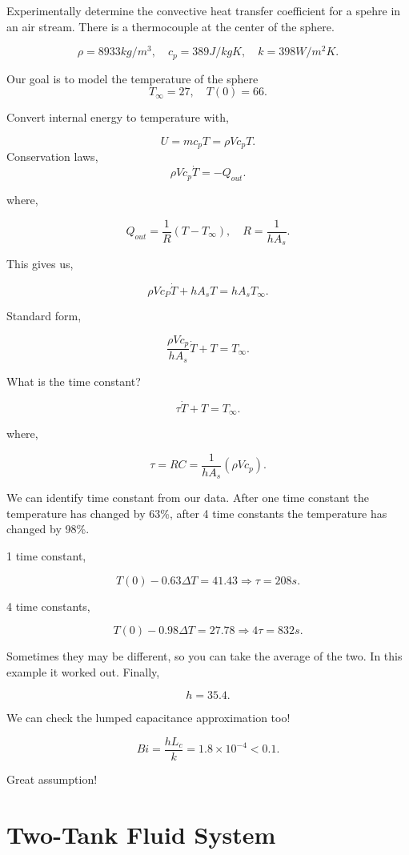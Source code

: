 \documentclass[12pt, a4paper]{report}
\begin{document}
  Experimentally determine the convective heat transfer coefficient for a spehre in an air stream. There is a thermocouple at the center of the sphere.

  \[
      \rho = 8933 kg/m^3, \quad c_p = 389 J/kgK, \quad k = 398 W/m^2K
    .\]

  Our goal is to model the temperature of the sphere
  \[
      T_{\infty} = 27, \quad T(0) = 66
    .\]

  Convert internal energy to temperature with,

  \[
      U = mc_pT = \rho Vc_pT
    .\]
  Conservation laws,
  \[
      \rho Vc_p \dot T = -Q_{out}
    .\]

  where,

  \[
      Q_{out} = \frac{1}{R}(T - T_{\infty}), \quad R = \frac{1}{hA_s}
    .\]

  This gives us,

  \[
      \rho Vc_P \dot T + hA_sT = hA_s T_{\infty}
    .\]

  Standard form,

  \[
      \frac{\rho Vc_p}{hA_s} \dot T + T = T_{\infty}
    .\]

  What is the time constant?

  \[
      \tau \dot T + T = T_{\infty}
    .\]

  where,

  \[
      \tau = RC = \frac{1}{hA_s}(\rho Vc_p)
    .\]

  We can identify time constant from our data. After one time constant the temperature has changed by 63\%, after 4 time constants the temperature has changed by 98\%.

  1 time constant,

  \[
      T(0) - 0.63\Delta T = 41.43 \Rightarrow \tau = 208s
    .\]

  4 time constants,

  \[
      T(0) - 0.98\Delta T = 27.78 \Rightarrow 4\tau = 832s
    .\]

  Sometimes they may be different, so you can take the average of the two. In this example it worked out. Finally,

  \[
      h = 35.4
    .\]

  We can check the lumped capacitance approximation too!

  \[
      Bi = \frac{hL_c}{k} = 1.8 \times 10^{-4} < 0.1
    .\]

  Great assumption!

  \section{Two-Tank Fluid System}

  
\end{document}
